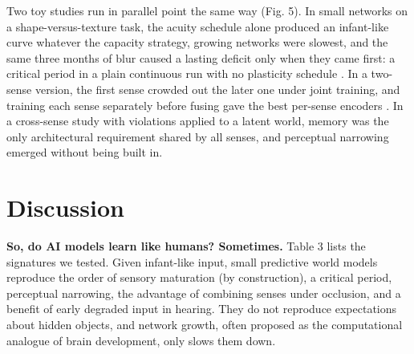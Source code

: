 \documentclass[
]{article}
\begin{document}
Two toy studies run in parallel point the same way (Fig. 5). In small
networks on a shape-versus-texture task, the acuity schedule alone
produced an infant-like curve whatever the capacity strategy, growing
networks were slowest, and the same three months of blur caused a
lasting deficit only when they came first: a critical period in a plain
continuous run with no plasticity schedule \citep{achille2019critical}.
In a two-sense version, the first sense crowded out the later one under
joint training, and training each sense separately before fusing gave
the best per-sense encoders
\citep{kleinman2023critical, turkewitz1982limitations}. In a cross-sense
study with violations applied to a latent world, memory was the only
architectural requirement shared by all senses, and perceptual narrowing
emerged without being built in.

\hypertarget{discussion}{%
\section{Discussion}\label{discussion}}

\textbf{So, do AI models learn like humans? Sometimes.} Table 3 lists
the signatures we tested. Given infant-like input, small predictive
world models reproduce the order of sensory maturation (by
construction), a critical period, perceptual narrowing, the advantage of
combining senses under occlusion, and a benefit of early degraded input
in hearing. They do not reproduce expectations about hidden objects, and
network growth, often proposed as the computational analogue of brain
development, only slows them down.
\end{document}
